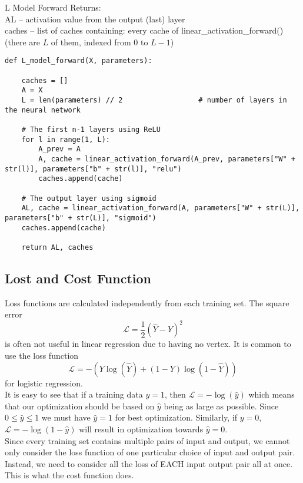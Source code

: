 \documentclass[a4paper]{article}
\begin{document}
\begin{enumerate}
\begin{alg}{L Model Forward}{}
Returns:\\
AL -- activation value from the output (last) layer\\
caches -- list of caches containing: every cache of linear\_activation\_forward() (there are $L$ of them, indexed from $0$ to $L-1$)\\
\begin{verbatim}
def L_model_forward(X, parameters):

    caches = []
    A = X
    L = len(parameters) // 2                  # number of layers in the neural network
    
    # The first n-1 layers using ReLU
    for l in range(1, L):
        A_prev = A 
        A, cache = linear_activation_forward(A_prev, parameters["W" + str(l)], parameters["b" + str(l)], "relu")
        caches.append(cache)

    # The output layer using sigmoid
    AL, cache = linear_activation_forward(A, parameters["W" + str(L)], parameters["b" + str(L)], "sigmoid")
    caches.append(cache)
          
    return AL, caches
\end{verbatim}
\end{alg}

\subsection{Lost and Cost Function}
Loss functions are calculated independently from each training set. The square error $$\mathcal{L}=\frac{1}{2}(\hat{Y}-Y)^2$$ is often not useful in linear regression due to having no vertex. It is common to use the loss function $$\mathcal{L}=-(Y\log(\hat{Y})+(1-Y)\log(1-\hat{Y}))$$ for logistic regression. \\

It is easy to see that if a training data $y=1$, then $\mathcal{L}=-\log(\hat{y})$ which means that our optimization should be based on $\hat{y}$ being as large as possible. Since $0\leq \hat{y}\leq 1$ we must have $\hat{y}=1$ for best optimization. Similarly, if $y=0$, $\mathcal{L}=-\log(1-\hat{y})$ will result in optimization towards $\hat{y}=0$. \\

Since every training set contains multiple pairs of input and output, we cannot only consider the loss function of one particular choice of input and output pair. Instead, we need to consider all the loss of EACH input output pair all at once. This is what the cost function does. 


\end{enumerate}
\end{document}

